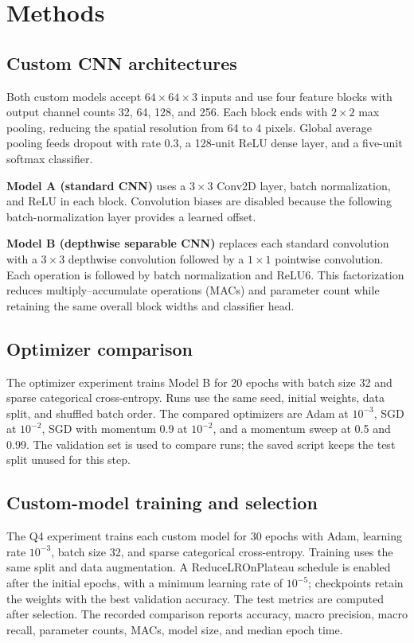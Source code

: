 \documentclass[11pt,a4paper]{article}
\begin{document}
\section{Methods}
\subsection{Custom CNN architectures}
Both custom models accept $64\times64\times3$ inputs and use four feature
blocks with output channel counts 32, 64, 128, and 256. Each block ends with
$2\times2$ max pooling, reducing the spatial resolution from 64 to 4 pixels.
Global average pooling feeds dropout with rate 0.3, a 128-unit ReLU dense
layer, and a five-unit softmax classifier.

\textbf{Model A (standard CNN)} uses a $3\times3$ Conv2D layer, batch
normalization, and ReLU in each block. Convolution biases are disabled because
the following batch-normalization layer provides a learned offset.

\textbf{Model B (depthwise separable CNN)} replaces each standard convolution
with a $3\times3$ depthwise convolution followed by a $1\times1$ pointwise
convolution. Each operation is followed by batch normalization and ReLU6. This
factorization reduces multiply--accumulate operations (MACs) and parameter
count while retaining the same overall block widths and classifier head.

\subsection{Optimizer comparison}
The optimizer experiment trains Model B for 20 epochs with batch size 32 and
sparse categorical cross-entropy. Runs use the same seed, initial weights,
data split, and shuffled batch order. The compared optimizers are Adam at
$10^{-3}$, SGD at $10^{-2}$, SGD with momentum 0.9 at $10^{-2}$, and a momentum
sweep at 0.5 and 0.99. The validation set is used to compare runs; the saved
script keeps the test split unused for this step.

\subsection{Custom-model training and selection}
The Q4 experiment trains each custom model for 30 epochs with Adam, learning
rate $10^{-3}$, batch size 32, and sparse categorical cross-entropy. Training
uses the same split and data augmentation. A ReduceLROnPlateau schedule is
enabled after the initial epochs, with a minimum learning rate of
$10^{-5}$; checkpoints retain the weights with the best validation accuracy.
The test metrics are computed after selection. The recorded comparison
reports accuracy, macro precision, macro recall, parameter counts, MACs, model
size, and median epoch time.
\end{document}
